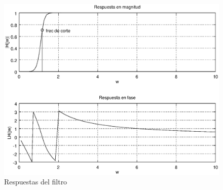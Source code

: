\documentclass[a4paper,12pt]{article}
\begin{document}
\begin{itemize}
\begin{figure}[H]
\begin{center}
                \includegraphics[width=\linewidth]{modeloFiltro.eps}
                \caption{Respuestas del filtro}
                \label{fig:respFil}
            \end{center}
        \end{figure}
        
    \end{itemize}
\end{document}
